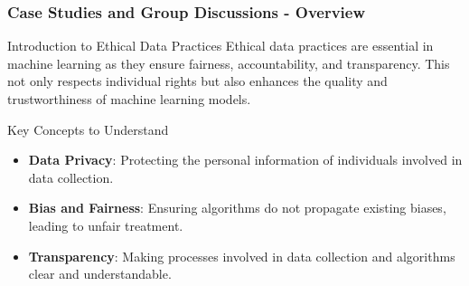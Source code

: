 \documentclass[aspectratio=169]{beamer}
\begin{document}
\begin{frame}[fragile]
    \frametitle{Case Studies and Group Discussions - Overview}
    \begin{block}{Introduction to Ethical Data Practices}
        Ethical data practices are essential in machine learning as they ensure fairness, accountability, and transparency. This not only respects individual rights but also enhances the quality and trustworthiness of machine learning models.
    \end{block}

    \begin{block}{Key Concepts to Understand}
        \begin{itemize}
            \item \textbf{Data Privacy}: Protecting the personal information of individuals involved in data collection.
            \item \textbf{Bias and Fairness}: Ensuring algorithms do not propagate existing biases, leading to unfair treatment.
            \item \textbf{Transparency}: Making processes involved in data collection and algorithms clear and understandable.
        \end{itemize}
    \end{block}
\end{frame}
\end{document}
